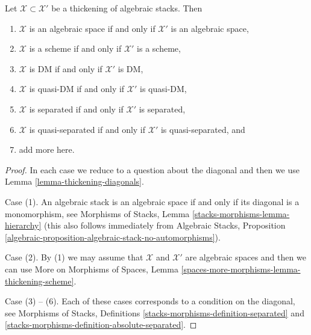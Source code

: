\begin{lemma}
\label{lemma-thickening-properties}
\begin{reference}
\cite[Theorem 2.2.5]{Conrad-moduli}
\end{reference}
Let $\mathcal{X} \subset \mathcal{X}'$ be a thickening of algebraic
stacks. Then
\begin{enumerate}
\item $\mathcal{X}$ is an algebraic space if and only if $\mathcal{X}'$
is an algebraic space,
\item $\mathcal{X}$ is a scheme if and only if $\mathcal{X}'$ is a scheme,
\item $\mathcal{X}$ is DM if and only if $\mathcal{X}'$ is DM,
\item $\mathcal{X}$ is quasi-DM if and only if $\mathcal{X}'$ is quasi-DM,
\item $\mathcal{X}$ is separated if and only if $\mathcal{X}'$ is separated,
\item $\mathcal{X}$ is quasi-separated if and only if $\mathcal{X}'$ is
quasi-separated, and
\item add more here.
\end{enumerate}
\end{lemma}

\begin{proof}
In each case we reduce to a question about the diagonal and then
we use Lemma \ref{lemma-thickening-diagonals}.

\medskip\noindent
Case (1). An algebraic stack is an algebraic space if and only if its
diagonal is a monomorphism, see
Morphisms of Stacks, Lemma \ref{stacks-morphisms-lemma-hierarchy}
(this also follows immediately from Algebraic Stacks,
Proposition \ref{algebraic-proposition-algebraic-stack-no-automorphisms}).

\medskip\noindent
Case (2). By (1) we may assume that $\mathcal{X}$ and $\mathcal{X}'$
are algebraic spaces and then we can use
More on Morphisms of Spaces, Lemma
\ref{spaces-more-morphisms-lemma-thickening-scheme}.

\medskip\noindent
Case (3) -- (6). Each of these cases corresponds to a condition
on the diagonal, see Morphisms of Stacks, Definitions
\ref{stacks-morphisms-definition-separated} and
\ref{stacks-morphisms-definition-absolute-separated}.
\end{proof}























